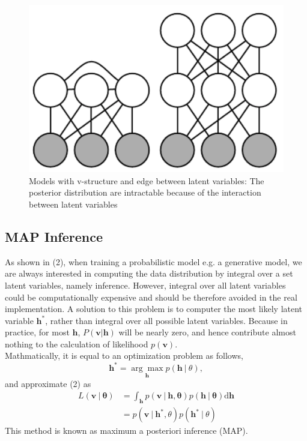 \documentclass[conference]{IEEEtran}
\begin{document}
\begin{figure}[ht]
	\centering
	\includegraphics[scale=0.8]{picture2.png}
     \caption{Models with v-structure and edge between latent variables: The posterior distribution are intractable because of the interaction between latent variables}
     \label{pic_2}
\end{figure}
\subsection{MAP Inference}
As shown in (2), when training a probabilistic model e.g. a generative model, we are always interested in computing the data distribution by integral over a set latent variables, namely inference. However, integral over all latent variables could be computationally expensive and should be therefore avoided in the real implementation. A solution to this problem is to computer the most likely latent variable $\boldsymbol{h^*}$, rather than integral over all possible latent variables. Because in practice, for most $\boldsymbol{h}$, $P(\boldsymbol{v} |\boldsymbol{h})$ will be nearly zero, and hence contribute almost nothing to the calculation of likelihood $p(\boldsymbol{v})$.\cite{Goodfellow-et-al-2016}\cite{doersch2016tutorial}\\

Mathmatically, it is equal to an optimization problem as follows,
\begin{equation}
\boldsymbol{h^*}=\underset{\boldsymbol{h}}{\arg\max}p(\boldsymbol{h}\ |\ \theta),
\end{equation}
and approximate (2) as 
\begin{equation}
  \begin{split}
    L(\boldsymbol{v}\ |\ \boldsymbol{\theta}) &=\int_{\boldsymbol{h}}p(\boldsymbol{v} \ |\ \boldsymbol{h}, \boldsymbol{\theta})p(\boldsymbol{h}\ |\ \boldsymbol{\theta})\mathrm{d}\boldsymbol{h}\\
    &=p(\boldsymbol{v}\ |\ \boldsymbol{h^*}, \theta)p(\boldsymbol{h^*}\ |\ \theta)
  \end{split}  
\end{equation}
This method is known as maximum a posteriori inference (MAP).\\
\end{document}
